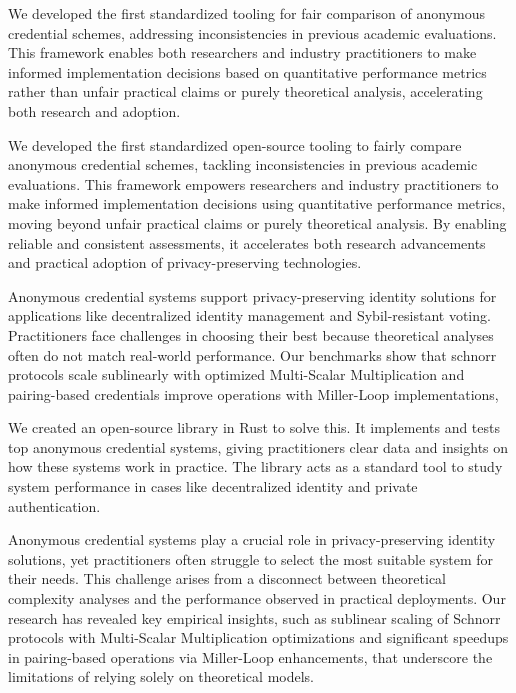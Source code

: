 
We developed the first standardized tooling for fair comparison of anonymous credential schemes, addressing inconsistencies in previous academic evaluations. This framework enables both researchers and industry practitioners to make informed implementation decisions based on quantitative performance metrics rather than unfair practical claims or purely theoretical analysis, accelerating both research and adoption.







We developed the first standardized open-source tooling to fairly compare anonymous credential schemes, tackling inconsistencies in previous academic evaluations. This framework empowers researchers and industry practitioners to make informed implementation decisions using quantitative performance metrics, moving beyond unfair practical claims or purely theoretical analysis. By enabling reliable and consistent assessments, it accelerates both research advancements and practical adoption of privacy-preserving technologies.








Anonymous credential systems support privacy-preserving identity solutions for applications like decentralized identity management and Sybil-resistant voting. Practitioners face challenges in choosing their best  because theoretical analyses often do not match real-world performance. Our benchmarks show that schnorr protocols scale sublinearly with optimized Multi-Scalar Multiplication and pairing-based credentials improve operations with  Miller-Loop implementations, 


We created an open-source library in Rust to solve this. It implements and tests top anonymous credential systems, giving practitioners clear data and insights on how these systems work in practice. The library acts as a standard tool to study system performance in cases like decentralized identity and private authentication.















Anonymous credential systems play a crucial role in privacy-preserving identity solutions, yet practitioners often struggle to select the most suitable system for their needs. This challenge arises from a disconnect between theoretical complexity analyses and the performance observed in practical deployments. Our research has revealed key empirical insights, such as sublinear scaling of Schnorr protocols with Multi-Scalar Multiplication optimizations and significant speedups in pairing-based operations via Miller-Loop enhancements, that underscore the limitations of relying solely on theoretical models.

